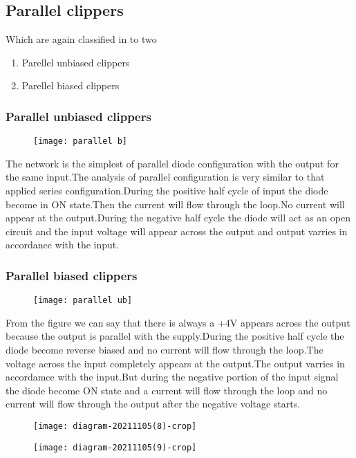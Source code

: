 \subsection{Parallel clippers}
Which are again classified in to two
\begin{enumerate}
	\item Parellel unbiased clippers
	\item Parellel biased clippers
\end{enumerate}

\subsubsection{Parallel unbiased clippers}
\begin{figure}[H]
\centering
\texttt{[image: parallel b]}
\caption{}
\label{}
\end{figure}
The network is the simplest of parallel diode configuration with the output for the same input.The analysis of parallel configuration is very similar to that applied  series configuration.During the positive half cycle of input the diode become in ON state.Then the current will flow through the loop.No current will appear at the output.During the negative half cycle the diode will act as an open circuit and the input voltage will appear across the output and output varries in accordance with the input.
\subsubsection{Parallel biased clippers}
\begin{figure}[H]
\centering
\texttt{[image: parallel ub]}
\caption{}
\label{}
\end{figure}
From the figure we can say that there is always a +4V appears across the output because the output is parallel with the supply.During the positive half cycle the diode become reverse biased and no current will flow through the loop.The voltage across the input completely appears at the output.The output varries in accordamce with the input.But during the negative portion of the input signal the diode become ON state and a current will flow through the loop and no current will flow through the output after the negative voltage starts.
\begin{example}
\end{example}
\begin{figure}[H]
\centering
\texttt{[image: diagram-20211105(8)-crop]}
\caption{}
\label{}
\end{figure}
\begin{example}
\end{example}
\begin{figure}[H]
\centering
\texttt{[image: diagram-20211105(9)-crop]}
\caption{}
\label{}
\end{figure}
